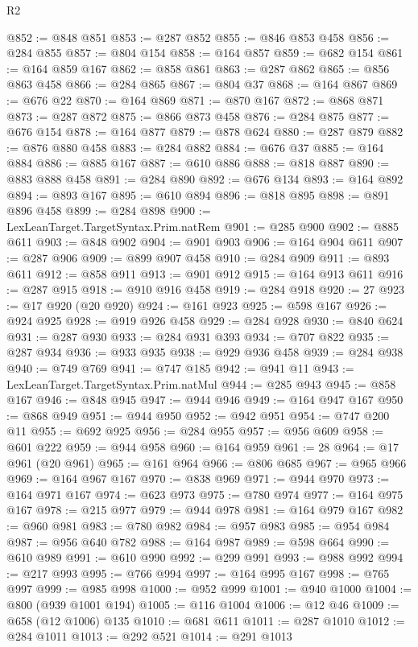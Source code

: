 \begin{lexlean}{R2}
\begin{coremodule}
@852 := @848 @851
@853 := @287 @852
@855 := @846 @853 @458
@856 := @284 @855
@857 := @804 @154
@858 := @164 @857
@859 := @682 @154
@861 := @164 @859 @167
@862 := @858 @861
@863 := @287 @862
@865 := @856 @863 @458
@866 := @284 @865
@867 := @804 @37
@868 := @164 @867
@869 := @676 @22
@870 := @164 @869
@871 := @870 @167
@872 := @868 @871
@873 := @287 @872
@875 := @866 @873 @458
@876 := @284 @875
@877 := @676 @154
@878 := @164 @877
@879 := @878 @624
@880 := @287 @879
@882 := @876 @880 @458
@883 := @284 @882
@884 := @676 @37
@885 := @164 @884
@886 := @885 @167
@887 := @610 @886
@888 := @818 @887
@890 := @883 @888 @458
@891 := @284 @890
@892 := @676 @134
@893 := @164 @892
@894 := @893 @167
@895 := @610 @894
@896 := @818 @895
@898 := @891 @896 @458
@899 := @284 @898
@900 := LexLeanTarget.TargetSyntax.Prim.natRem
@901 := @285 @900
@902 := @885 @611
@903 := @848 @902
@904 := @901 @903
@906 := @164 @904 @611
@907 := @287 @906
@909 := @899 @907 @458
@910 := @284 @909
@911 := @893 @611
@912 := @858 @911
@913 := @901 @912
@915 := @164 @913 @611
@916 := @287 @915
@918 := @910 @916 @458
@919 := @284 @918
@920 := 27
@923 := @17 @920 (@20 @920)
@924 := @161 @923
@925 := @598 @167
@926 := @924 @925
@928 := @919 @926 @458
@929 := @284 @928
@930 := @840 @624
@931 := @287 @930
@933 := @284 @931 @393
@934 := @707 @822
@935 := @287 @934
@936 := @933 @935
@938 := @929 @936 @458
@939 := @284 @938
@940 := @749 @769
@941 := @747 @185
@942 := @941 @11
@943 := LexLeanTarget.TargetSyntax.Prim.natMul
@944 := @285 @943
@945 := @858 @167
@946 := @848 @945
@947 := @944 @946
@949 := @164 @947 @167
@950 := @868 @949
@951 := @944 @950
@952 := @942 @951
@954 := @747 @200 @11
@955 := @692 @925
@956 := @284 @955
@957 := @956 @609
@958 := @601 @222
@959 := @944 @958
@960 := @164 @959
@961 := 28
@964 := @17 @961 (@20 @961)
@965 := @161 @964
@966 := @806 @685
@967 := @965 @966
@969 := @164 @967 @167
@970 := @838 @969
@971 := @944 @970
@973 := @164 @971 @167
@974 := @623 @973
@975 := @780 @974
@977 := @164 @975 @167
@978 := @215 @977
@979 := @944 @978
@981 := @164 @979 @167
@982 := @960 @981
@983 := @780 @982
@984 := @957 @983
@985 := @954 @984
@987 := @956 @640 @782
@988 := @164 @987
@989 := @598 @664
@990 := @610 @989
@991 := @610 @990
@992 := @299 @991
@993 := @988 @992
@994 := @217 @993
@995 := @766 @994
@997 := @164 @995 @167
@998 := @765 @997
@999 := @985 @998
@1000 := @952 @999
@1001 := @940 @1000
@1004 := @800 (@939 @1001 @194)
@1005 := @116 @1004
@1006 := @12 @46
@1009 := @658 (@12 @1006) @135
@1010 := @681 @611
@1011 := @287 @1010
@1012 := @284 @1011
@1013 := @292 @521
@1014 := @291 @1013

\end{coremodule}
\end{lexlean}
